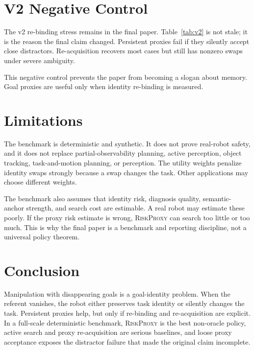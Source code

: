 \documentclass{article}
\newcommand{\method}{\textsc{RiskProxy}\xspace}
\begin{document}
\section{V2 Negative Control}

The v2 re-binding stress remains in the final paper. Table~\ref{tab:v2} is not stale; it is the reason the final claim changed. Persistent proxies fail if they silently accept close distractors. Re-acquisition recovers most cases but still has nonzero swaps under severe ambiguity.

\begin{table}[t]
\centering
\small

\caption{V2 re-binding ambiguity stress. Loose proxy acceptance can catastrophically bind to distractors; active re-acquisition recovers most but not all cases.}
\label{tab:v2}
\end{table}

This negative control prevents the paper from becoming a slogan about memory. Goal proxies are useful only when identity re-binding is measured.

\section{Limitations}

The benchmark is deterministic and synthetic. It does not prove real-robot safety, and it does not replace partial-observability planning, active perception, object tracking, task-and-motion planning, or perception. The utility weights penalize identity swaps strongly because a swap changes the task. Other applications may choose different weights.

The benchmark also assumes that identity risk, diagnosis quality, semantic-anchor strength, and search cost are estimable. A real robot may estimate these poorly. If the proxy risk estimate is wrong, \method can search too little or too much. This is why the final paper is a benchmark and reporting discipline, not a universal policy theorem.

\section{Conclusion}

Manipulation with disappearing goals is a goal-identity problem. When the referent vanishes, the robot either preserves task identity or silently changes the task. Persistent proxies help, but only if re-binding and re-acquisition are explicit. In a full-scale deterministic benchmark, \method is the best non-oracle policy, active search and proxy re-acquisition are serious baselines, and loose proxy acceptance exposes the distractor failure that made the original claim incomplete.
\end{document}
